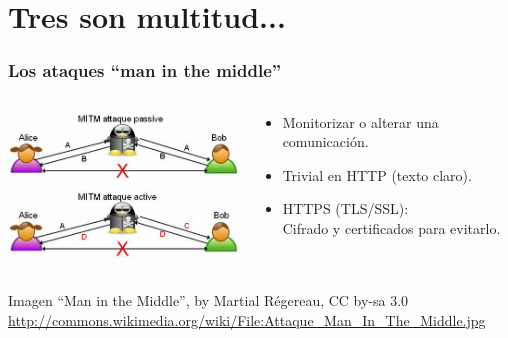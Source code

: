 %
%

\section{Tres son multitud...}

\begin{frame}
\frametitle{Los ataques ``man in the middle''}

\begin{columns}[T]
\begin{column}{.48\textwidth}
\includegraphics[width=6.5cm]{figs/man-in-the-middle}


\end{column}%
\hfill%
\begin{column}{.48\textwidth}
{\Large
\begin{itemize}
\item Monitorizar o alterar una comunicación.
\item Trivial en HTTP (texto claro).
\item HTTPS (TLS/SSL): \\
  Cifrado y certificados para evitarlo.
\end{itemize}
}
\end{column}%
\end{columns}
\vspace{1cm}
\begin{flushright}
{\footnotesize
Imagen ``Man in the Middle'', by Martial Régereau, CC by-sa 3.0 \\
\url{http://commons.wikimedia.org/wiki/File:Attaque_Man_In_The_Middle.jpg} 
}
\end{flushright}

\end{frame}

